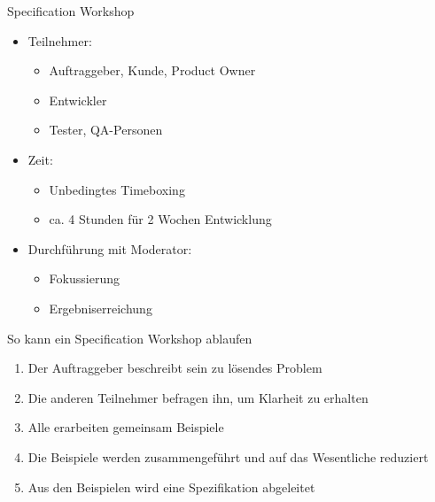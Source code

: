 \begin{frame}{Specification Workshop}

\begin{itemize}
	\item Teilnehmer: 
	\begin{itemize}
		\item Auftraggeber, Kunde, Product Owner
		\item Entwickler
		\item Tester, QA-Personen
	\end{itemize}
	\item Zeit: 
	\begin{itemize}
		\item Unbedingtes Timeboxing
		\item ca. 4 Stunden für 2 Wochen Entwicklung
	\end{itemize}
	\item Durchführung mit Moderator: 
	\begin{itemize}
		\item Fokussierung
		\item Ergebniserreichung
	\end{itemize}
\end{itemize}

\end{frame}



\begin{frame}{So kann ein Specification Workshop ablaufen}

\begin{enumerate}
	\item Der Auftraggeber beschreibt sein zu lösendes Problem
	\item Die anderen Teilnehmer befragen ihn, um Klarheit zu erhalten
	\item Alle erarbeiten gemeinsam Beispiele
	\item Die Beispiele werden zusammengeführt und auf das Wesentliche reduziert
	\item Aus den Beispielen wird eine Spezifikation abgeleitet
\end{enumerate}

\end{frame}


